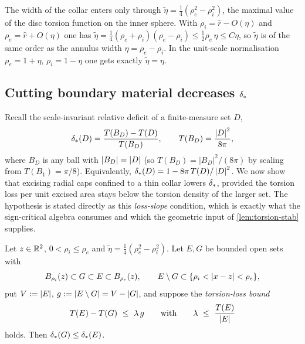\begin{remark}\label{rem:barrier}
The width of the collar enters only through
$\tilde\eta=\tfrac14(\rho_e^2-\rho_i^2)$, the maximal value of the disc
torsion function on the inner sphere. With $\rho_i=\hat r-O(\eta)$ and
$\rho_e=\hat r+O(\eta)$ one has $\tilde\eta=\tfrac14(\rho_e+\rho_i)
(\rho_e-\rho_i)\le\tfrac12\rho_e\,\eta\le C\eta$, so $\tilde\eta$ is of the
same order as the annulus width $\eta=\rho_e-\rho_i$. In the unit-scale
normalisation $\rho_e=1+\eta$, $\rho_i=1-\eta$ one gets exactly
$\tilde\eta=\eta$.
\end{remark}

\subsection{Cutting boundary material decreases \texorpdfstring{$\delta_{*}$}{the scale-invariant deficit}}

Recall the scale-invariant relative deficit of a finite-measure set $D$,
\begin{equation}\label{eq:dstar-recall}
   \delta_{*}(D)=\frac{T(B_D)-T(D)}{T(B_D)},\qquad
   T(B_D)=\frac{\left\lvert D\right\rvert^2}{8\pi},
\end{equation}
where $B_D$ is any ball with $\left\lvert B_D\right\rvert=\left\lvert D\right\rvert$ (so
$T(B_D)=|B_D|^2/(8\pi)$ by scaling from $T(B_1)=\pi/8$). Equivalently,
$\delta_{*}(D)=1-8\pi\,T(D)/\left\lvert D\right\rvert^2$. We now show that excising radial caps
confined to a thin collar lowers $\delta_{*}$, provided the torsion loss per unit
excised area stays below the torsion density of the larger set. The
hypothesis is stated directly as this \emph{loss-slope} condition, which is
exactly what the sign-critical algebra consumes and which the geometric input
of \cref{lem:torsion-stab} supplies.

\begin{lemma}\label{lem:cutdeficit}
Let $z\in\mathbb{R}^2$, $0<\rho_i\le\rho_e$ and $\tilde\eta=\tfrac14(\rho_e^2-
\rho_i^2)$. Let $E,G$ be bounded open sets with
\begin{equation}\label{eq:cut-incl}
   B_{\rho_i}(z)\subset G\subset E\subset B_{\rho_e}(z),
   \qquad E\setminus G\subset\{\rho_i<\left\lvert x-z\right\rvert<\rho_e\},
\end{equation}
put $V:=\left\lvert E\right\rvert$, $g:=\left\lvert E\setminus G\right\rvert=V-\left\lvert G\right\rvert$, and suppose the
\emph{torsion-loss bound}
\begin{equation}\label{eq:cutcond}
   T(E)-T(G)\ \le\ \lambda\,g
   \qquad\text{with}\qquad
   \lambda\ \le\ \frac{T(E)}{\left\lvert E\right\rvert}
\end{equation}
holds. Then $\delta_{*}(G)\le\delta_{*}(E)$.
\end{lemma}

